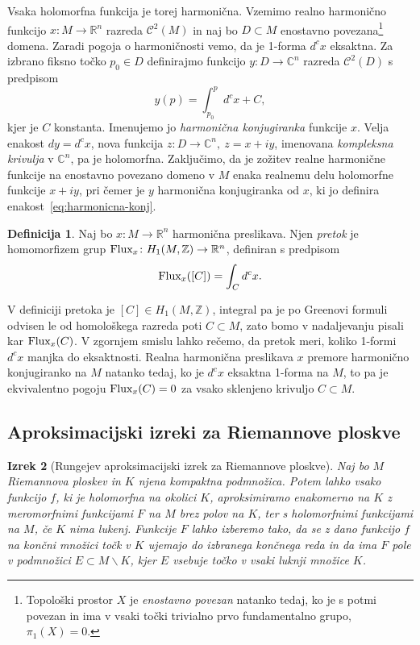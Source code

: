 \documentclass[12pt,a4paper,twoside]{article}
\theoremstyle{definition} %
\newtheorem{definicija}{Definicija}[section]
\theoremstyle{plain} %
\newtheorem{izrek}[definicija]{Izrek}
\numberwithin{equation}{section}  %
\newcommand{\R}{\mathbb R}
\newcommand{\Z}{\mathbb Z}
\begin{document}
Vsaka holomorfna funkcija je torej harmonična. 
Vzemimo realno harmonično funkcijo $x \colon M \to \mathbb{R}^{n}$ razreda $\mathcal{C}^2(M)$ in naj bo $D \subset M$ enostavno povezana\footnote{Topološki prostor $X$ je \emph{enostavno povezan} natanko tedaj, ko je s potmi povezan in ima v vsaki točki trivialno prvo fundamentalno grupo, $\pi_{1}(X)=0$.} domena. Zaradi pogoja o harmoničnosti vemo, da je 1-forma $d^{c}x$ eksaktna. Za izbrano fiksno točko $p_{0} \in D$ definirajmo funkcijo $y \colon D \to \mathbb{C}^{n}$ razreda $\mathcal{C}^2(D)$ s predpisom
\begin{equation} \label{eq:harmonicna-konj}
y(p) = \int_{p_0}^{p} d^{c}x + C,
\end{equation}
kjer je $C$ konstanta. Imenujemo jo \emph{harmonična konjugiranka} funkcije $x$. Velja enakost $dy = d^{c}x$, nova funkcija $z \colon D \to \mathbb{C}^{n}, \ z = x+iy$, imenovana \emph{kompleksna krivulja} v $\mathbb{C}^{n}$, pa je holomorfna. Zaključimo, da je zožitev realne harmonične funkcije na enostavno povezano domeno v $M$ enaka realnemu delu holomorfne funkcije $x+iy$, pri čemer je $y$ harmonična konjugiranka od $x$, ki jo definira enakost~\eqref{eq:harmonicna-konj}.

\begin{definicija}
Naj bo $x \colon M \to \R^{n}$ harmonična preslikava. Njen \emph{pretok} je homomorfizem grup $\textup{Flux}_{x} \colon H_{1} (M, \Z) \to \R^{n}$, definiran s predpisom 
\begin{equation} \label{eq:pretok}
\textup{Flux}_{x} ([C]) = \int_{C} {d^{c} x}.
\end{equation}
\end{definicija}
%
V definiciji pretoka je $[C] \in H_{1} (M, \Z)$, integral pa je po Greenovi formuli odvisen le od homološkega razreda poti $C \subset M$, zato bomo v nadaljevanju pisali kar $\textup{Flux}_{x} (C)$. V zgornjem smislu lahko rečemo, da pretok meri, koliko 1-formi $d^{c}x$ manjka do eksaktnosti. Realna harmonična preslikava $x$ premore harmonično konjugiranko na $M$ natanko tedaj, ko je $d^{c}x$ eksaktna 1-forma na $M$, to pa je ekvivalentno pogoju $\textup{Flux}_{x}(C)=0$ za vsako sklenjeno krivuljo $C \subset M$.

\subsection{Aproksimacijski izreki za Riemannove ploskve}
%
\begin{izrek} [Rungejev aproksimacijski izrek za Riemannove ploskve] \label{izr:Runge}
Naj bo $M$ Riemannova ploskev in $K$ njena kompaktna podmnožica. 
Potem lahko vsako funkcijo $f$, ki je holomorfna na okolici $K$, aproksimiramo enakomerno na $K$ z meromorfnimi funkcijami $F$ na $M$ brez polov na $K$, ter s holomorfnimi funkcijami na $M$, če $K$ nima lukenj.
Funkcije $F$ lahko izberemo tako, da se z dano funkcijo $f$ na končni množici točk v $K$ ujemajo do izbranega končnega reda in da ima $F$ pole v podmnožici $E \subset M \backslash K$, kjer $E$ vsebuje točko v vsaki luknji množice $K$. 
\end{izrek}
\end{document}
